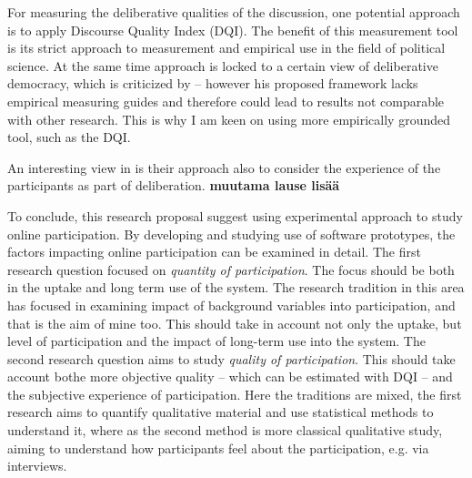 \documentclass[journal,a4paper]{IEEEtran}
\begin{document}
For measuring the deliberative qualities of the discussion, one potential approach is to apply  Discourse Quality Index (DQI). The benefit of this measurement tool is its strict approach to measurement and empirical use in the field of political science. At the same time  approach is locked to a certain view of deliberative democracy, which is criticized by  -- however his proposed framework lacks empirical measuring guides and therefore could lead to results not comparable with other research. This is why I am keen on using more empirically grounded tool, such as the DQI.

An interesting view in  is their approach also to consider the experience of the participants as part of deliberation. \textbf{muutama lause lisää}


To conclude, this research proposal suggest using experimental approach to study online participation. By developing and studying use of software prototypes, the factors impacting online participation can be examined in detail.
The first research question focused on \textit{quantity of participation}. The focus should be both in the uptake and long term use of the system. The research tradition in this area has focused in examining impact of background variables into participation, and that is the aim of mine too. This should take in account not only the uptake, but level of participation and the impact of long-term use into the system.
The second research question aims to study \textit{quality of participation}. This should take account bothe more objective quality -- which can be estimated with DQI -- and the subjective experience of participation. Here the traditions are mixed, the first research aims to quantify qualitative material and use statistical methods to understand it, where as the second method is more classical qualitative study, aiming to understand how participants feel about the participation, e.g. via interviews.



\end{document}
